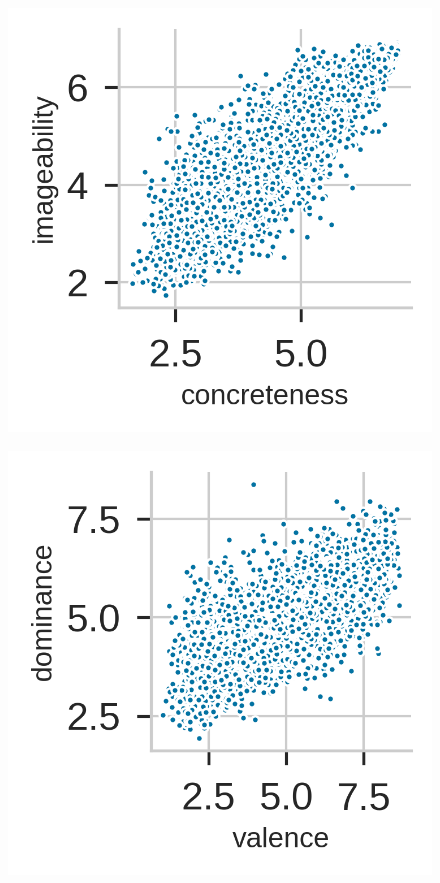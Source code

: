 \documentclass[a4paper,11pt,dvipsnames]{article}
\begin{document}
\begin{figure}[ht]
    \centering
    \begin{minipage}{0.3\textwidth}
    \centering
    \includegraphics[width=0.75\columnwidth]{Graphs/pp_imageability_concreteness.png}
    \label{fig:pairplot_ima_conc}
\end{minipage}
\begin{minipage}{0.3\textwidth}
\centering
    \includegraphics[width=0.75\columnwidth]{Graphs/pp_dominance_valence.png}
    \label{fig:pairplot_dom_val}
    \end{minipage}
    \begin{minipage}{0.3\textwidth}

\end{minipage}
\end{figure}
\end{document}
